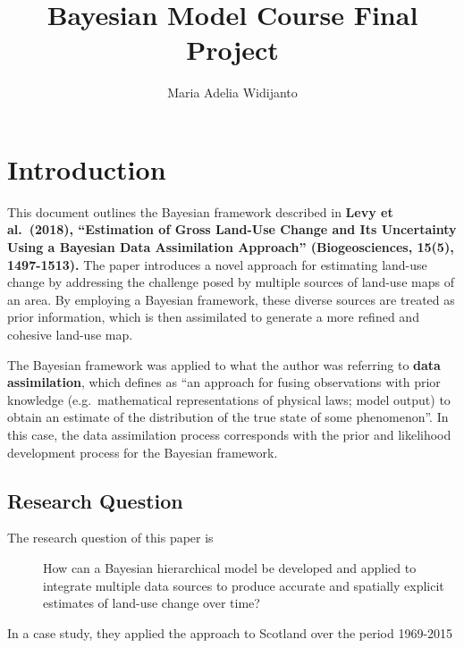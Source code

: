 \documentclass[
  letterpaper,
  DIV=11,
  numbers=noendperiod]{scrartcl}
\title{Bayesian Model Course Final Project}
\author{Maria Adelia Widijanto}
\date{}
\begin{document}
\maketitle
\ifdefined\Shaded\renewenvironment{Shaded}{\begin{tcolorbox}[enhanced, borderline west={3pt}{0pt}{shadecolor}, interior hidden, breakable, frame hidden, boxrule=0pt, sharp corners]}{\end{tcolorbox}}\fi

\hypertarget{introduction}{%
\section{Introduction}\label{introduction}}

This document outlines the Bayesian framework described in \textbf{Levy
et al.~(2018), ``Estimation of Gross Land-Use Change and Its Uncertainty
Using a Bayesian Data Assimilation Approach'' (Biogeosciences, 15(5),
1497-1513).} The paper introduces a novel approach for estimating
land-use change by addressing the challenge posed by multiple sources of
land-use maps of an area. By employing a Bayesian framework, these
diverse sources are treated as prior information, which is then
assimilated to generate a more refined and cohesive land-use map.

The Bayesian framework was applied to what the author was referring to
\textbf{data assimilation}, which defines as ``an approach for fusing
observations with prior knowledge (e.g.~mathematical representations of
physical laws; model output) to obtain an estimate of the distribution
of the true state of some phenomenon''. In this case, the data
assimilation process corresponds with the prior and likelihood
development process for the Bayesian framework.

\hypertarget{research-question}{%
\subsection{Research Question}\label{research-question}}

\begin{description}
\item[The research question of this paper is]
How can a Bayesian hierarchical model be developed and applied to
integrate multiple data sources to produce accurate and spatially
explicit estimates of land-use change over time?
\end{description}

In a case study, they applied the approach to Scotland over the period
1969-2015
\end{document}
